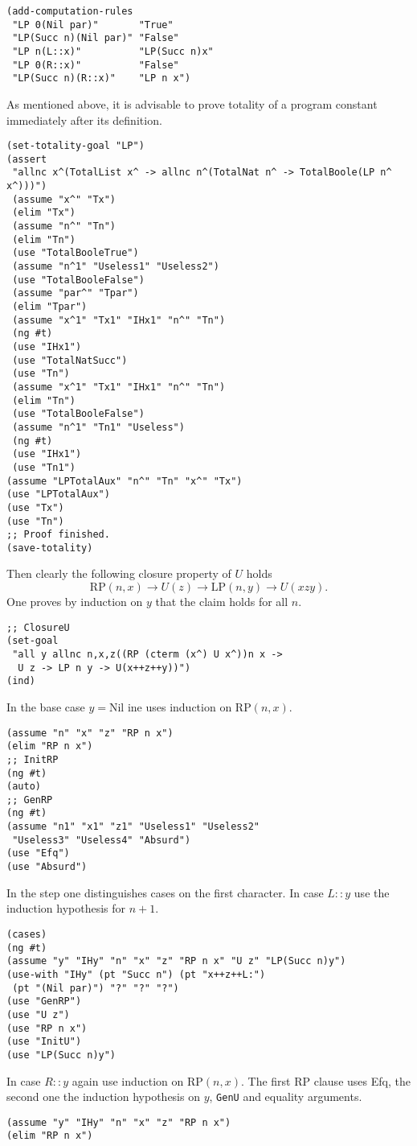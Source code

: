 \documentclass[12pt]{amsart}
\newcommand{\nil}{\mathrm{Nil}}
\begin{document}
\begin{appendix}
\begin{verbatim}
(add-computation-rules
 "LP 0(Nil par)"       "True"
 "LP(Succ n)(Nil par)" "False"
 "LP n(L::x)"          "LP(Succ n)x"
 "LP 0(R::x)"          "False"
 "LP(Succ n)(R::x)"    "LP n x")
\end{verbatim}
As mentioned above, it is advisable to prove totality of a program
constant immediately after its definition.
\begin{verbatim}
(set-totality-goal "LP")
(assert
 "allnc x^(TotalList x^ -> allnc n^(TotalNat n^ -> TotalBoole(LP n^ x^)))")
 (assume "x^" "Tx")
 (elim "Tx")
 (assume "n^" "Tn")
 (elim "Tn")
 (use "TotalBooleTrue")
 (assume "n^1" "Useless1" "Useless2")
 (use "TotalBooleFalse")
 (assume "par^" "Tpar")
 (elim "Tpar")
 (assume "x^1" "Tx1" "IHx1" "n^" "Tn")
 (ng #t)
 (use "IHx1")
 (use "TotalNatSucc")
 (use "Tn")
 (assume "x^1" "Tx1" "IHx1" "n^" "Tn")
 (elim "Tn")
 (use "TotalBooleFalse")
 (assume "n^1" "Tn1" "Useless")
 (ng #t)
 (use "IHx1")
 (use "Tn1")
(assume "LPTotalAux" "n^" "Tn" "x^" "Tx")
(use "LPTotalAux")
(use "Tx")
(use "Tn")
;; Proof finished.
(save-totality)
\end{verbatim}
Then clearly the following closure property of $U$ holds
\begin{equation*}
  \mathrm{RP}(n,x) \to U(z) \to \mathrm{LP}(n,y) \to U(xzy).
\end{equation*}
One proves by induction on $y$ that the claim holds for all $n$.
\begin{verbatim}
;; ClosureU
(set-goal
 "all y allnc n,x,z((RP (cterm (x^) U x^))n x ->
  U z -> LP n y -> U(x++z++y))")
(ind)
\end{verbatim}
In the base case $y=\nil$ ine uses induction on $\mathrm{RP}(n,x)$.
\begin{verbatim}
(assume "n" "x" "z" "RP n x")
(elim "RP n x")
;; InitRP
(ng #t)
(auto)
;; GenRP
(ng #t)
(assume "n1" "x1" "z1" "Useless1" "Useless2"
 "Useless3" "Useless4" "Absurd")
(use "Efq")
(use "Absurd")
\end{verbatim}
In the step one distinguishes cases on the first character.  In case
$L::y$ use the induction hypothesis for $n+1$.
\begin{verbatim}
(cases)
(ng #t)
(assume "y" "IHy" "n" "x" "z" "RP n x" "U z" "LP(Succ n)y")
(use-with "IHy" (pt "Succ n") (pt "x++z++L:")
 (pt "(Nil par)") "?" "?" "?")
(use "GenRP")
(use "U z")
(use "RP n x")
(use "InitU")
(use "LP(Succ n)y")
\end{verbatim}
In case $R::y$ again use induction on $\mathrm{RP}(n,x)$.  The first
$\mathrm{RP}$ clause uses Efq, the second one the induction hypothesis
on $y$, \verb|GenU| and equality arguments.
\begin{verbatim}
(assume "y" "IHy" "n" "x" "z" "RP n x")
(elim "RP n x")


\end{verbatim}
\end{appendix}
\end{document}
